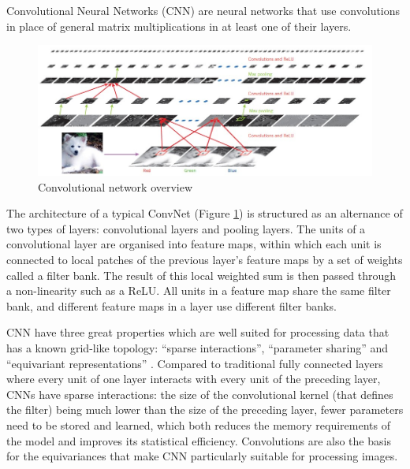 Convolutional Neural Networks (CNN) are neural networks that use convolutions in place of general matrix multiplications in at least one of their layers. 
%
\begin{figure}
\centerline{\includegraphics[scale=0.6]{images/chapter_2/CNN.jpg}}
\caption{Convolutional network overview \citep{DBLP:journals/nature/LeCunBH15}}
\label{fig:cnn_overview}
\end{figure}
%
The architecture of a typical ConvNet (Figure \ref{fig:cnn_overview}) is structured as an alternance of two types of layers: convolutional layers and pooling layers. The units of a convolutional layer are organised into feature maps, within which each unit is connected to local patches of the previous layer's feature maps by a set of weights called a filter bank. The result of this local weighted sum is then passed through a non-linearity such as a ReLU. All units in a feature map share the same filter bank, and different feature maps in a layer use different filter banks.

CNN have three great properties which are well suited for processing data that has a known grid-like topology: “sparse interactions”, “parameter sharing” and “equivariant representations” \citep{goodfellow2016deep}. Compared to traditional fully connected layers where every unit of one layer interacts with every unit of the preceding layer, CNNs have sparse interactions: the size of the convolutional kernel (that defines the filter) being much lower than the size of the preceding layer, fewer parameters need to be stored and learned, which both reduces the memory requirements of the model and improves its statistical efficiency. Convolutions are also the basis for the equivariances that make CNN particularly suitable for processing images. 

